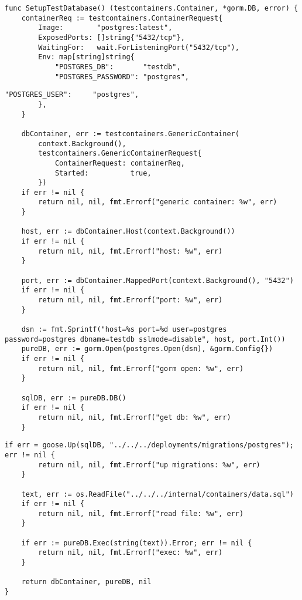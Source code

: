 \begin{appendices}
	\begin{lstlisting}[label=testCon,caption=Функция запуска контейнера для интеграционного тестирования]
func SetupTestDatabase() (testcontainers.Container, *gorm.DB, error) {
	containerReq := testcontainers.ContainerRequest{
		Image:        "postgres:latest",
		ExposedPorts: []string{"5432/tcp"},
		WaitingFor:   wait.ForListeningPort("5432/tcp"),
		Env: map[string]string{
			"POSTGRES_DB":       "testdb",
			"POSTGRES_PASSWORD": "postgres",
	\end{lstlisting}
	
	\begin{lstlisting}[label=testCon,caption=Функция запуска контейнера для интеграционного тестирования (продолжение)]
	        "POSTGRES_USER":     "postgres",
		},
	}

	dbContainer, err := testcontainers.GenericContainer(
		context.Background(),
		testcontainers.GenericContainerRequest{
			ContainerRequest: containerReq,
			Started:          true,
		})
	if err != nil {
		return nil, nil, fmt.Errorf("generic container: %w", err)
	}

	host, err := dbContainer.Host(context.Background())
	if err != nil {
		return nil, nil, fmt.Errorf("host: %w", err)
	}

	port, err := dbContainer.MappedPort(context.Background(), "5432")
	if err != nil {
		return nil, nil, fmt.Errorf("port: %w", err)
	}

	dsn := fmt.Sprintf("host=%s port=%d user=postgres password=postgres dbname=testdb sslmode=disable", host, port.Int())
	pureDB, err := gorm.Open(postgres.Open(dsn), &gorm.Config{})
	if err != nil {
		return nil, nil, fmt.Errorf("gorm open: %w", err)
	}

	sqlDB, err := pureDB.DB()
	if err != nil {
		return nil, nil, fmt.Errorf("get db: %w", err)
	}
	\end{lstlisting}
	
	\begin{lstlisting}[label=testCon,caption=Функция запуска контейнера для интеграционного тестирования (продолжение)]
	if err = goose.Up(sqlDB, "../../../deployments/migrations/postgres"); err != nil {
		return nil, nil, fmt.Errorf("up migrations: %w", err)
	}

	text, err := os.ReadFile("../../../internal/containers/data.sql")
	if err != nil {
		return nil, nil, fmt.Errorf("read file: %w", err)
	}

	if err := pureDB.Exec(string(text)).Error; err != nil {
		return nil, nil, fmt.Errorf("exec: %w", err)
	}

	return dbContainer, pureDB, nil
}
	\end{lstlisting}

	
\end{appendices}